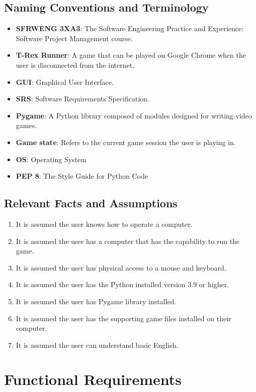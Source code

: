 \documentclass[12pt, titlepage]{article}
\begin{document}
\subsection{Naming Conventions and Terminology}
\begin{itemize}
    \item \textbf{SFRWENG 3XA3}: The Software Engineering Practice and Experience: Software Project Management course.
    \item \textbf{T-Rex Runner}: A game that can be played on Google Chrome when the user is disconnected from the internet.
    \item \textbf{GUI}: Graphical User Interface.
    \item \textbf{SRS}: Software Requirements Specification.
    \item \textbf{Pygame}: A Python library composed of modules designed for writing video games.
    \item \textbf{Game state}: Refers to the current game session the user is playing in.
    \item \textbf{OS}: Operating System
    \item \textbf{PEP 8}: The Style Guide for Python Code
\end{itemize}

\subsection{Relevant Facts and Assumptions}
\begin{enumerate}
    \item It is assumed the user knows how to operate a computer.
    \item It is assumed the user has a computer that has the capability to run the game.
    \item It is assumed the user has physical access to a mouse and keyboard.
    \item It is assumed the user has the Python installed version 3.9 or higher.
    \item It is assumed the user has Pygame library installed.
    \item It is assumed the user has the supporting game files installed on their computer.
    \item It is assumed the user can understand basic English.
\end{enumerate}

\section{Functional Requirements}
\end{document}
